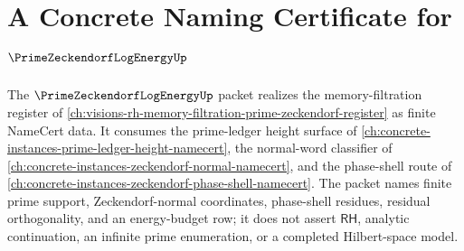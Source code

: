 \chapter{A Concrete Naming Certificate for $\PrimeZeckendorfLogEnergyUp$}
\label{ch:concrete-instances-prime-zeckendorf-log-energy-namecert}

The $\PrimeZeckendorfLogEnergyUp$ packet realizes the memory-filtration register of \autoref{ch:visions-rh-memory-filtration-prime-zeckendorf-register} as finite NameCert data. It consumes the prime-ledger height surface of \autoref{ch:concrete-instances-prime-ledger-height-namecert}, the normal-word classifier of \autoref{ch:concrete-instances-zeckendorf-normal-namecert}, and the phase-shell route of \autoref{ch:concrete-instances-zeckendorf-phase-shell-namecert}. The packet names finite prime support, Zeckendorf-normal coordinates, phase-shell residues, residual orthogonality, and an energy-budget row; it does not assert $\mathsf{RH}$, analytic continuation, an infinite prime enumeration, or a completed Hilbert-space model.

